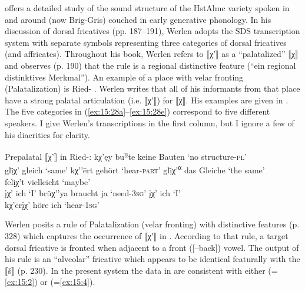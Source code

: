{\citet{Werlen1977} offers a detailed study of the sound structure of the HstAlmc variety spoken in and around  (now Brig-Gris) couched in early generative phonology. In his discussion of dorsal fricatives (pp. 187--191), Werlen adopts the SDS transcription system with separate symbols representing three categories of dorsal fricatives (and affricates). Throughout his book, Werlen refers to ⟦χ'⟧ as a “palatalized” ⟦χ⟧ and observes (p. 190) that the rule is a regional distinctive feature (“ein regional distinktives Merkmal”). An example of a place with velar fronting (Palatalization) is Ried- \citep[328]{Werlen1977}. Werlen writes that all of his informants from that place have a strong palatal articulation (i.e. ⟦χ'⟧) for ⟦χ⟧. His examples are given in . The five categories in (\ref{ex:15:28a}--\ref{ex:15:28e}) correspond to five different speakers. I give Werlen’s transcriptions in the first column, but I ignore a few of his diacritics for clarity.\largerpage[-1]




\ea%
\label{ex:15:28}Prepalatal ⟦χ'⟧ in Ried-:
\ea\label{ex:15:28a} kχ'ẹy bu\textsuperscript{u̯}te \tab keine Bauten \tab ‘no structure-\textsc{pl}’\\
    glị̄χ' \tab gleich \tab ‘same’
\ex\label{ex:15:28b} kχ'{}'ērt \tab gehört \tab ‘hear-\textsc{part}’
\ex\label{ex:15:28c} glị̄χ'\textsuperscript{α} \tab das Gleiche \tab ‘the same’\\
    felị̄χ't \tab vielleicht \tab ‘maybe’\\
    įχ' \tab ich \tab ‘I’
\ex\label{ex:15:28d} brüχ'{}'ya \tab braucht ja \tab ‘need-\textsc{3}\textsc{sg}’
\ex\label{ex:15:28e} įχ' \tab ich \tab ‘I’\\
     kχ'ērįχ' \tab höre ich \tab ‘hear-\textsc{1}\textsc{sg}’
     \z
\z 

Werlen posits a rule of Palatalization (velar fronting) with distinctive features (p. 328) which captures the occurrence of ⟦χ'⟧ in . According to that rule, a target dorsal fricative is fronted when adjacent to a front ([--back]) vowel. The output of his rule is an “alveolar” fricative which appears to be identical featurally with the  ⟦š⟧ (p. 230). In the present system the data in  are consistent with either  (=\ref{ex:15:2}) or  (=\ref{ex:15:4}).

}
